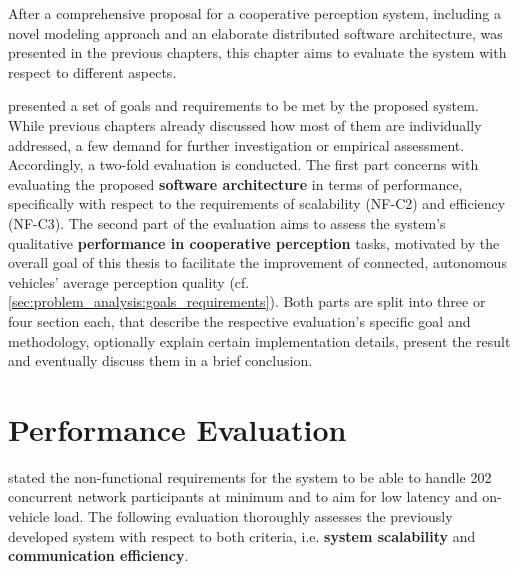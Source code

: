After a comprehensive proposal for a cooperative perception system, including a novel modeling approach and an elaborate distributed software architecture, was presented in the previous chapters, this chapter aims to evaluate the system with respect to different aspects.

 presented a set of goals and requirements to be met by the proposed system. While previous chapters already discussed how most of them are individually addressed, a few demand for further investigation or empirical assessment. Accordingly, a two-fold evaluation is conducted. The first part concerns with evaluating the proposed \textbf{software architecture} in terms of performance, specifically with respect to the requirements of scalability (NF-C2) and efficiency (NF-C3). The second part of the evaluation aims to assess the system's qualitative \textbf{performance in cooperative perception} tasks, motivated by the overall goal of this thesis to facilitate the improvement of connected, autonomous vehicles' average perception quality (cf. \cref{sec:problem_analysis:goals_requirements}). Both parts are split into three or four section each, that describe the respective evaluation's specific goal and methodology, optionally explain certain implementation details, present the result and eventually discuss them in a brief conclusion.

\section{Performance Evaluation}
\label{sec:evaluation:performance_evaluation}
 stated the non-functional requirements for the system to be able to handle 202 concurrent network participants at minimum and to aim for low latency and on-vehicle load. The following evaluation thoroughly assesses the previously developed system with respect to both criteria, i.e. \textbf{system scalability} and \textbf{communication efficiency}.

